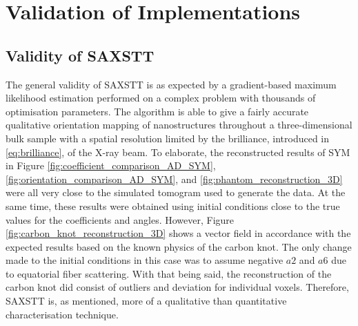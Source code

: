 \chapter{Validation of Implementations} \label{ch:validation_discussion}

\section{Validity of SAXSTT}\label{sec:validity_saxstt}
The general validity of SAXSTT is as expected by a gradient-based maximum likelihood estimation performed on a complex problem with thousands of optimisation parameters.
The algorithm is able to give a fairly accurate qualitative orientation mapping of nanostructures
throughout a three-dimensional bulk sample with a spatial resolution limited by the brilliance, introduced in \eqref{eq:brilliance}, of the X-ray beam.
To elaborate, the reconstructed results of SYM in
Figure \ref{fig:coefficient_comparison_AD_SYM},
\ref{fig:orientation_comparison_AD_SYM}, and
\ref{fig:phantom_reconstruction_3D} were all very close to the simulated tomogram used to generate the data.
At the same time, these results were obtained using initial conditions close to the true values for the coefficients and angles.
However, Figure \ref{fig:carbon_knot_reconstruction_3D} shows a vector field in accordance with the expected results based on the known physics of the carbon knot.
The only change made to the initial conditions in this case was to assume negative $a2$ and $a6$ due to equatorial fiber scattering.
With that being said, the reconstruction of the carbon knot did consist of outliers and deviation for individual voxels.
Therefore, SAXSTT is, as mentioned, more of a qualitative than quantitative characterisation technique. %




